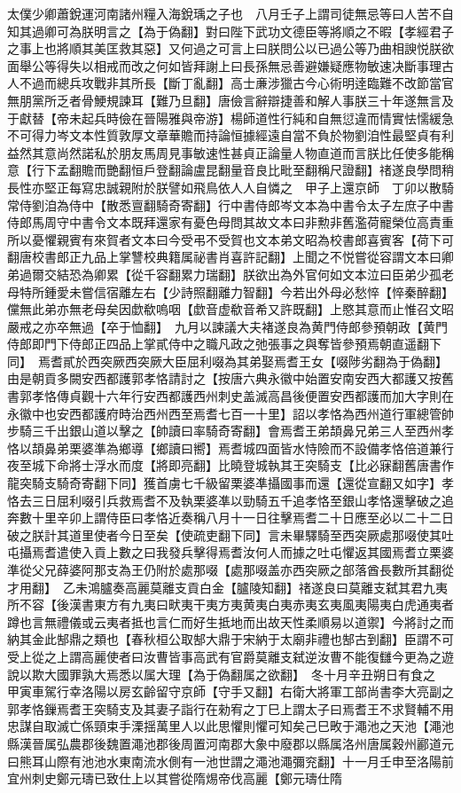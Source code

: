 太僕少卿蕭銳運河南諸州糧入海銳瑀之子也　八月壬子上謂司徒無忌等曰人苦不自知其過卿可為朕明言之【為于偽翻】對曰陛下武功文德臣等將順之不暇【孝經君子之事上也將順其美匡救其惡】又何過之可言上曰朕問公以已過公等乃曲相諛悦朕欲面舉公等得失以相戒而改之何如皆拜謝上曰長孫無忌善避嫌疑應物敏速决斷事理古人不過而總兵攻戰非其所長【斷丁亂翻】高士亷涉獵古今心術明逹臨難不改節當官無朋黨所乏者骨鯁規諫耳【難乃旦翻】唐儉言辭辯捷善和解人事朕三十年遂無言及于獻替【帝未起兵時儉在晉陽雅與帝游】楊師道性行純和自無愆違而情實怯懦緩急不可得力岑文本性質敦厚文章華贍而持論恒據經遠自當不負於物劉洎性最堅貞有利益然其意尚然諾私於朋友馬周見事敏速性甚貞正論量人物直道而言朕比任使多能稱意【行下孟翻贍而艷翻恒戶登翻論盧昆翻量音良比毗至翻稱尺證翻】禇遂良學問稍長性亦堅正每寫忠誠親附於朕譬如飛鳥依人人自憐之　甲子上還京師　丁卯以散騎常侍劉洎為侍中【散悉亶翻騎奇寄翻】行中書侍郎岑文本為中書令太子左庶子中書侍郎馬周守中書令文本既拜還家有憂色母問其故文本曰非勲非舊濫荷寵榮位高責重所以憂懼親賓有來賀者文本曰今受弔不受賀也文本弟文昭為校書郎喜賓客【荷下可翻唐校書郎正九品上掌讐校典籍属祕書肖喜許記翻】上聞之不悦嘗從容謂文本曰卿弟過爾交結恐為卿累【從千容翻累力瑞翻】朕欲出為外官何如文本泣曰臣弟少孤老母特所鍾愛未嘗信宿離左右【少詩照翻離力智翻】今若出外母必愁悴【悴秦醉翻】儻無此弟亦無老母矣因歔欷嗚咽【歔音虚欷音希又許既翻】上愍其意而止惟召文昭嚴戒之亦卒無過【卒于恤翻】　九月以諫議大夫褚遂良為黄門侍郎參預朝政【黄門侍郎即門下侍郎正四品上掌貳侍中之職凡政之弛張事之與奪皆參預焉朝直遥翻下同】　焉耆貳於西突厥西突厥大臣屈利啜為其弟娶焉耆王女【啜陟劣翻為于偽翻】由是朝貢多闕安西都護郭孝恪請討之【按唐六典永徽中始置安南安西大都護又按舊書郭孝恪傳貞觀十六年行安西都護西州刺史盖滅高昌後便置安西都護而加大字則在永徽中也安西都護府時治西州西至焉耆七百一十里】詔以孝恪為西州道行軍總管帥步騎三千出銀山道以擊之【帥讀曰率騎奇寄翻】會焉耆王弟頡鼻兄弟三人至西州孝恪以頡鼻弟栗婆準為鄉導【鄉讀曰嚮】焉耆城四面皆水恃險而不設備孝恪倍道兼行夜至城下命將士浮水而度【將即亮翻】比曉登城執其王突騎支【比必寐翻舊唐書作龍突騎支騎奇寄翻下同】獲首虜七千級留栗婆凖攝國事而還【還從宣翻又如字】孝恪去三日屈利啜引兵救焉耆不及執栗婆凖以勁騎五千追孝恪至銀山孝恪還擊破之追奔數十里辛卯上謂侍臣曰孝恪近奏稱八月十一日往擊焉耆二十日應至必以二十二日破之朕計其道里使者今日至矣【使疏吏翻下同】言未畢驛騎至西突厥處那啜使其吐屯攝焉耆遣使入貢上數之曰我發兵擊得焉耆汝何人而據之吐屯懼返其國焉耆立栗婆準從父兄薛婆阿那支為王仍附於處那啜【處那啜盖亦西突厥之部落酋長數所其翻從才用翻】　乙未鴻臚奏高麗莫離支貢白金【臚陵知翻】禇遂良曰莫離支弑其君九夷所不容【後漢書東方有九夷曰畎夷干夷方夷黄夷白夷赤夷玄夷風夷陽夷白虎通夷者蹲也言無禮儀或云夷者抵也言仁而好生抵地而出故天性柔順易以道禦】今將討之而納其金此郜鼎之類也【春秋桓公取郜大鼎于宋納于太廟非禮也郜古到翻】臣謂不可受上從之上謂高麗使者曰汝曹皆事高武有官爵莫離支弑逆汝曹不能復讎今更為之遊說以欺大國罪孰大焉悉以属大理【為于偽翻属之欲翻】　冬十月辛丑朔日有食之　甲寅車駕行幸洛陽以房玄齡留守京師【守手又翻】右衛大將軍工部尚書李大亮副之　郭孝恪鏁焉耆王突騎支及其妻子詣行在勑宥之丁巳上謂太子曰焉耆王不求賢輔不用忠謀自取滅亡係頸束手溧揺萬里人以此思懼則懼可知矣己巳畋于澠池之天池【澠池縣漢晉属弘農郡後魏置澠池郡後周置河南郡大象中廢郡以縣属洛州唐属穀州酈道元曰熊耳山際有池池水東南流水側有一池世謂之澠池澠彌兖翻】十一月壬申至洛陽前宜州刺史鄭元璹已致仕上以其嘗從隋焬帝伐高麗【鄭元璹仕隋
